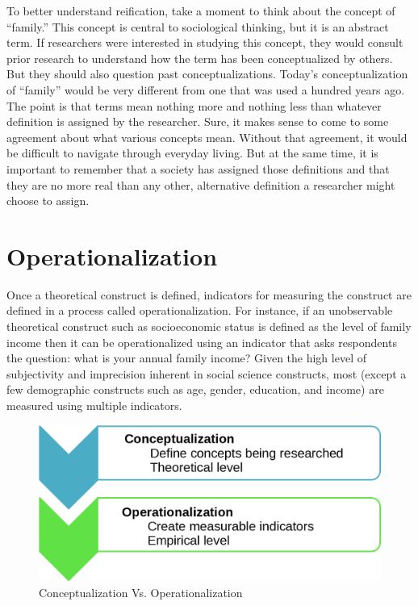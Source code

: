 To better understand reification, take a moment to think about the concept of ``family.'' This concept is central to sociological thinking, but it is an abstract term. If researchers were interested in studying this concept, they would consult prior research to understand how the term has been conceptualized by others. But they should also question past conceptualizations. Today's conceptualization of ``family'' would be very different from one that was used a hundred years ago. The point is that terms mean nothing more and nothing less than whatever definition is assigned by the researcher. Sure, it makes sense to come to some agreement about what various concepts mean. Without that agreement, it would be difficult to navigate through everyday living. But at the same time, it is important to remember that a society has assigned those definitions and that they are no more real than any other, alternative definition a researcher might choose to assign.

\section{Operationalization}

Once a theoretical construct is defined, indicators for measuring the construct are defined in a process called operationalization. For instance, if an unobservable theoretical construct such as socioeconomic status is defined as the level of family income then it can be operationalized using an indicator that asks respondents the question: what is your annual family income? Given the high level of subjectivity and imprecision inherent in social science constructs, most (except a few demographic constructs such as age, gender, education, and income) are measured using multiple indicators.

\begin{figure}[H]
	\centering
	\includegraphics[width=\maxwidth{.95\linewidth}]{gfx/05-ConceptVsOper}
	\caption{Conceptualization Vs. Operationalization}
	\label{05:fig02}
\end{figure}

